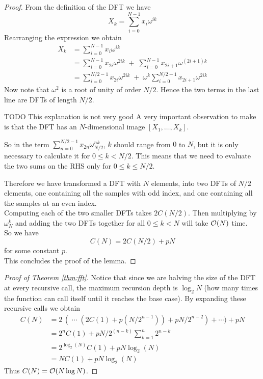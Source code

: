 \begin{proof}
From the definition of the DFT we have
\[
    X_k = \sum^{N-1}_{i=0}x_i\omega^{ik}
\]
Rearranging the expression we obtain
\begin{align}
    X_k
    &= \sum^{N-1}_{i=0}x_i\omega^{ik} \nonumber\\
    &= \sum^{N-1}_{i=0}x_{2i}\omega^{2ik} \;+\; \sum^{N-1}_{i=0}x_{2i+1} \omega^{(2i+1)k} \nonumber\\
    &= \sum^{N/2-1}_{i=0}x_{2i}\omega^{2ik} \;+\; \omega^k \sum^{N/2-1}_{i=0}x_{2i+1}\omega^{2ik} \label{eq:keystep}
\end{align}
Now note that $\omega^2$ is a root of unity of order $N/2$. Hence the two terms in the last line are DFTs of length $N/2$.

TODO This explanation is not very good
A very important observation to make is that the DFT has an $N$-dimensional image $[X_1, \ldots, X_k]$.

So in the term $\sum^{N/2-1}_{n=0}x_{2n}\omega^{nk}_{N/2}$, $k$ should range from $0$ to $N$, but it is only necessary to calculate it for $0 \leq k < N/2$. This means that we need to evaluate the two sums on the RHS only for $0 \leq k \leq N/2$.

Therefore we have transformed a DFT with $N$ elements, into two DFTs of $N/2$ elements, one containing all the samples with odd index, and one containing all the samples at an even index.\\
Computing each of the two smaller DFTs takes $2C(N/2)$. Then multiplying by $\omega^k_N$ and adding the two DFTs together for all $0 \leq k < N$ will take $\mathcal O(N)$ time. \\
So we have
\[
    C(N) = 2 C(N/2) + pN
\]
for some constant $p$.\\
This concludes the proof of the lemma.
\end{proof}

\begin{proof}[Proof of Theorem \ref{thm:fft}]
    Notice that since we are halving the size of the DFT at every recursive call, the maximum recursion depth is $\log_2 N$ (how many times the function can call itself until it reaches the base case).
    By expanding these recursive calls we obtain
    \begin{align*}
    C(N) &= 2\,(\;\cdots\; (2C(1) + p(N/2^{n-1})) + pN/2^{n-2}) + \cdots ) + pN\\
         &= 2^{n}C(1) + pN/2^{(n-k)}\sum^n_{k=1} 2^{n-k}\\
         &= 2^{\log_2(N)}C(1) + pN\log_2(N)\\
         &= NC(1) + pN\log_2(N)
    \end{align*}
    Thus $C(N) = \mathcal O(N \log N)$.
\end{proof}

